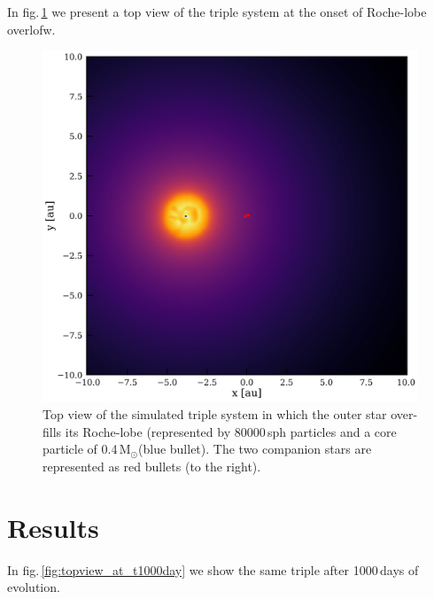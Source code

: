 \documentclass{aastex62}
\newcommand{\MSun}{\mbox{M$_\odot$}}
\begin{document}
In fig.\,\ref{fig:topview_at_t0} we present a top view of the triple
system at the onset of Roche-lobe overlofw.  

\begin{figure}[ht!]
  \includegraphics[width=\columnwidth]{fig_t0_N80000_M012MSun1109MSun_a02au_e00_inc9deg.pdf}
\caption{Top view of the simulated triple system in which the outer star over-fills its Roche-lobe
  (represented by 80000\,sph particles and a core particle of
  0.4\,\MSun (blue bullet). The two companion stars are represented as
  red bullets (to the right).
\label{fig:topview_at_t0}}
\end{figure}

\section{Results} \label{results}

In fig.\,\ref{fig:topview_at_t1000day} we show the same triple 
after 1000\,days of evolution.
\end{document}

